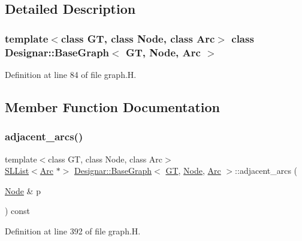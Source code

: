\subsection{Detailed Description}
\subsubsection*{template$<$class GT, class Node, class Arc$>$\newline
class Designar\+::\+Base\+Graph$<$ G\+T, Node, Arc $>$}



Definition at line 84 of file graph.\+H.



\subsection{Member Function Documentation}
\mbox{\label{class_designar_1_1_base_graph_a2c91912381c8220c0b2530e5ad187231}} 
\subsubsection{\texorpdfstring{adjacent\+\_\+arcs()}{adjacent\_arcs()}}
{\footnotesize\ttfamily template$<$class GT, class Node, class Arc$>$ \\
\hyperlink{class_designar_1_1_s_l_list}{S\+L\+List}$<$\hyperlink{namespace_designar_a3f55fb5513d62ff47cbc8f72b8e95d6f}{Arc} $\ast$$>$ \hyperlink{class_designar_1_1_base_graph}{Designar\+::\+Base\+Graph}$<$ \hyperlink{demo-buildgraph_8_c_a3001c40d2c31ca87ed96cd7d1334a55e}{GT}, \hyperlink{namespace_designar_a5af326c65aa2bd26b26c410f2030d09e}{Node}, \hyperlink{namespace_designar_a3f55fb5513d62ff47cbc8f72b8e95d6f}{Arc} $>$\+::adjacent\+\_\+arcs (\begin{DoxyParamCaption}\item[{\hyperlink{namespace_designar_a5af326c65aa2bd26b26c410f2030d09e}{Node} \&}]{p }\end{DoxyParamCaption}) const\hspace{0.3cm}{\ttfamily [inline]}}



Definition at line 392 of file graph.\+H.

\mbox{\label{class_designar_1_1_base_graph_af7a57a1088105a79466546620bf830b3}} 
